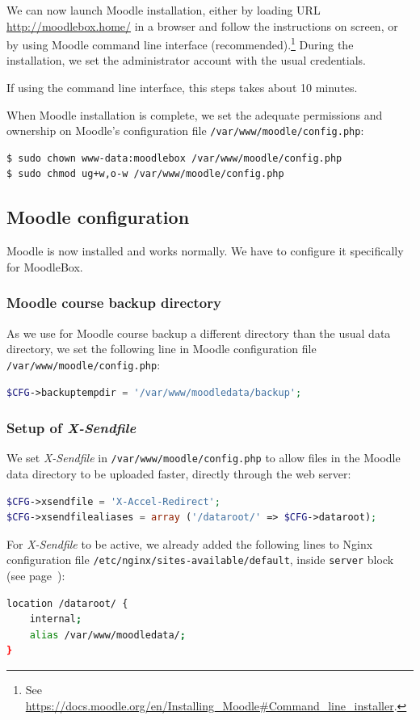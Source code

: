\documentclass[12pt]{article}
\begin{document}
We can now launch Moodle installation, either by loading URL \url{http://moodlebox.home/} in a browser and follow the instructions on screen, or by using Moodle command line interface (recommended).\footnote{See \url{https://docs.moodle.org/en/Installing_Moodle\#Command_line_installer}.}
During the installation, we set the administrator account with the usual credentials.

If using the command line interface, this steps takes about 10 minutes.

When Moodle installation is complete, we set the adequate permissions and ownership on Moodle's configuration file \lstinline{/var/www/moodle/config.php}:
\begin{lstlisting}[language=bash]
$ sudo chown www-data:moodlebox /var/www/moodle/config.php
$ sudo chmod ug+w,o-w /var/www/moodle/config.php
\end{lstlisting}

\subsection{Moodle configuration}

Moodle is now installed and works normally.
We have to configure it specifically for MoodleBox.

\subsubsection{Moodle course backup directory}

As we use for Moodle course backup a different directory than the usual data directory, we set the following line in Moodle configuration file \lstinline{/var/www/moodle/config.php}:
\begin{lstlisting}[language=php]
$CFG->backuptempdir = '/var/www/moodledata/backup';
\end{lstlisting}

\subsubsection{Setup of \emph{X-Sendfile}}

We set \emph{X-Sendfile} in \lstinline{/var/www/moodle/config.php} to allow files in the Moodle data directory to be uploaded faster, directly through the web server:
\begin{lstlisting}[language=php]
$CFG->xsendfile = 'X-Accel-Redirect';
$CFG->xsendfilealiases = array ('/dataroot/' => $CFG->dataroot);
\end{lstlisting}
For \emph{X-Sendfile} to be active, we already added the following lines to Nginx configuration file \lstinline{/etc/nginx/sites-available/default}, inside \lstinline{server} block (see page~\pageref{ssec-nginx-php}):
\begin{lstlisting}[language=bash]
location /dataroot/ {
    internal;
    alias /var/www/moodledata/;
}
\end{lstlisting}
\end{document}
